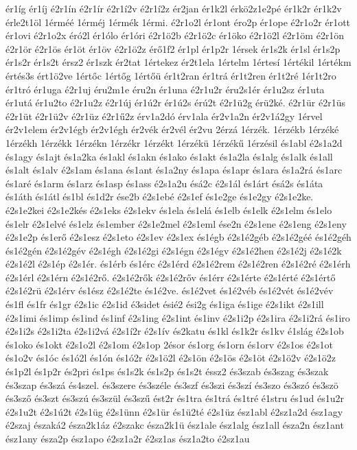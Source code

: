 {ér1íg
ér1íj
é2r1ín
é2r1ír
é2r1í2v
é2r1í2z
ér2jan
ér1k2l
érkö2z1e2pé
ér1k2r
ér1k2v
érle2t1öl
1érméé
1érméj
1érmék
1érmi.
é2r1o2l
ér1ont
éro2p
ér1ope
é2r1o2r
ér1ott
ér1ovi
é2r1o2x
éró2l
ér1ólo
ér1óri
é2r1ö2b
é2r1ö2c
ér1öko
é2r1ö2l
é2r1öm
é2r1ön
é2r1ör
é2r1ös
ér1öt
ér1öv
é2r1ö2z
érő1f2
ér1pl
ér1p2r
1érsek
ér1s2k
ér1sl
ér1s2p
ér1s2r
ér1s2t
érsz2
ér1szk
ér2tat
1értekez
ér2t1ela
1értelm
1értesí
1értékil
1értékm
értés3s
ért1ö2ve
1értőc
1értőg
1értőü
ér1t2ran
ér1trá
ér1t2ren
ér1t2ré
1ér1t2ro
ér1tró
ér1uga
é2r1uj
éru2m1e
éru2n
ér1una
é2r1u2r
éru2s1ér
ér1u2sz
ér1uta
ér1utá
ér1u2to
é2r1u2z
é2r1új
ér1ú2r
ér1ú2s
érú2t
é2r1ü2g
érü2ké.
é2r1ür
é2r1üs
é2r1üt
é2r1ü2v
é2r1üz
é2r1ű2z
érv1a2dó
érv1ala
ér2v1a2n
ér2v1á2gy
1érvel
ér2v1elem
ér2v1égb
ér2v1égh
ér2vék
ér2vél
ér2vu
2érzá
1érzék.
1érzékb
1érzéké
1érzékh
1érzékk
1érzékn
1érzékr
1érzékt
1érzékü
1érzékű
1érzésil
és1abl
é2s1a2d
és1agy
és1ajt
és1a2ka
és1akl
és1akn
és1ako
és1akt
és1a2la
és1alg
és1alk
és1all
és1alt
és1alv
é2s1am
és1ana
és1ant
és1a2ny
és1apa
és1apr
és1ara
és1a2rá
és1arc
és1aré
és1arm
és1arz
és1asp
és1ass
é2s1a2u
ésá2c
é2s1ál
és1árt
ésá2s
és1áta
és1áth
és1átl
és1bl
és1d2r
ése2b
é2s1ebé
é2s1ef
és1e2ge
és1e2gy
é2s1e2ke.
é2s1e2kei
é2s1e2kés
é2s1eks
é2s1ekv
és1ela
és1elá
és1elb
és1elk
é2s1elm
és1elo
és1elr
é2s1elvé
és1elz
és1ember
é2s1e2mel
é2s1eml
ése2n
é2s1ene
é2s1eng
é2s1eny
é2s1e2p
és1erő
é2s1esz
é2s1eto
é2s1ev
é2s1ex
és1égb
é2s1é2géb
é2s1é2géé
és1é2géh
és1é2gén
é2s1é2gév
é2s1égh
é2s1é2gi
é2s1égn
é2s1égv
é2s1é2hen
é2s1é2j
é2s1é2k
é2s1é2l
é2s1ép
é2s1ér.
és1érb
és1érc
é2s1érd
é2s1é2rem
é2s1é2ren
é2s1é2ré
é2s1érh
é2s1érl
é2s1érn
é2s1é2rő.
é2s1é2rők
é2s1é2rőv
és1érr
é2s1érte
é2s1érté
é2s1értő
é2s1é2rü
é2s1érv
és1ész
é2s1é2te
és1é2ve.
és1é2vet
és1é2véb
és1é2vét
és1é2vév
és1fl
és1fr
és1gr
é2s1ic
é2s1id
é3sidet
ésié2
ési2g
és1iga
és1ige
é2s1ikt
é2s1ill
é2s1imi
és1imp
és1ind
és1inf
é2s1ing
é2s1int
és1inv
é2s1i2p
é2s1ira
é2s1i2rá
és1iro
é2s1i2s
é2s1i2ta
é2s1i2vá
é2s1í2r
é2s1ív
és2katu
és1kl
és1k2r
és1kv
é1slág
é2s1ob
és1oko
és1okt
é2s1o2l
é2s1om
é2s1op
2ésor
és1org
és1orn
és1orv
é2s1os
é2s1ot
és1o2v
és1óc
és1ó2l
és1ón
és1ó2r
é2s1ö2l
é2s1ön
é2s1ös
é2s1öt
é2s1ö2v
é2s1ö2z
és1p2l
és1p2r
és2pri
és1ps
és1s2k
és1s2p
és1s2t
éssz2
és3szab
és3szag
és3szak
és3szap
és3szá
és4szel.
és3szere
és3széle
és3szf
és3szi
és3szí
és3szo
és3szó
és3szö
és3sző
és3szt
és3szú
és3szül
és3szű
ést2r
és1tra
és1trá
és1tré
é1stru
és1ud
és1u2r
é2s1u2t
é2s1ú2t
é2s1üg
é2s1ünn
é2s1ür
és1ü2té
é2s1üz
ész1abl
é2sz1a2d
ész1agy
é2szaj
északá2
észa2k1áz
é2szakc
észa2k1ü
ész1ale
ész1alg
ész1all
észa2n
ész1ant
ész1any
észa2p
ész1apo
é2sz1a2r
é2sz1as
ész1a2to
é2sz1au
}
